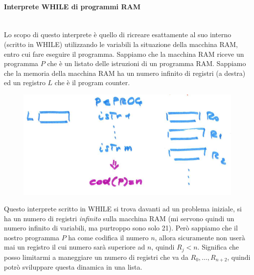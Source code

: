 \documentclass{article}
\begin{document}
\paragraph{Interprete WHILE di programmi RAM}\mbox{}\\
Lo scopo di questo interprete è quello di ricreare esattamente al suo interno (scritto
in WHILE) utilizzando le variabili la situazione della macchina RAM, entro cui fare
eseguire il programma.
\newline\newline
Sappiamo che la macchina RAM riceve un programma $P$ che è un listato delle istruzioni di un programma
RAM. Sappiamo che la memoria della macchina RAM ha un numero infinito di registri
(a destra) ed un registro $L$ che è il program counter.
\begin{figure}[H]
    \centering
    \includegraphics[scale=0.5]{images/interprete_while_ram.png}
\end{figure}
Questo interprete scritto in WHILE si trova davanti ad un problema iniziale, si ha un
numero di registri \textit{infinito} sulla macchina RAM (mi servono quindi un
numero infinito di variabili, ma purtroppo sono solo 21). Però sappiamo che il
nostro programma $P$ ha come codifica il numero $n$, allora sicuramente non userà
mai un registro il cui numero sarà superiore ad $n$, quindi $R_j<n$. Significa
che posso limitarmi a maneggiare un numero di registri che va da $R_0,\dots,R_{n+2}$,
quindi potrò sviluppare questa dinamica in una lista.
\end{document}
